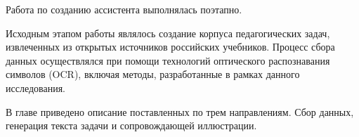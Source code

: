 Работа по созданию ассистента выполнялась поэтапно. 

Исходным этапом работы являлось создание корпуса педагогических задач, извлеченных из открытых источников российских учебников. Процесс сбора данных осуществлялся при помощи технологий оптического распознавания символов (OCR), включая методы, разработанные в рамках данного исследования.

В главе приведено описание поставленных по трем направлениям. Сбор данных, генерация текста задачи и сопровождающей иллюстрации.